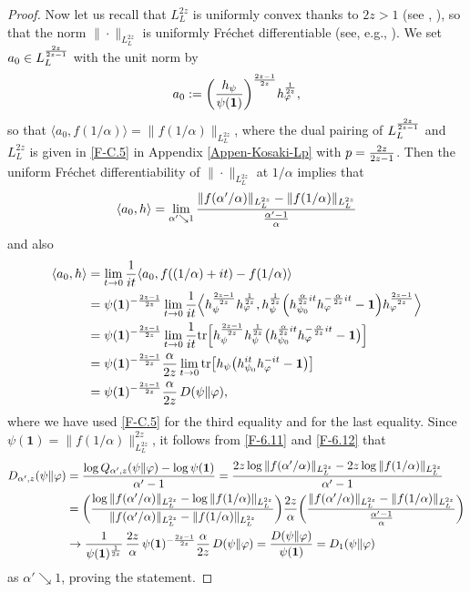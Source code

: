 \documentclass[12pt]{article}
\theoremstyle{definition}
\theoremstyle{remark}
\numberwithin{equation}{section}
\def\Tr{\mathrm{tr}}
\def\<{\langle}
\def\>{\rangle}
\def\ffi{\varphi}
\def\1{\mathbf{1}}
\begin{document}
\begin{proof}
Now let us recall that $L^{2z}_L$ is uniformly convex thanks to $2z>1$ (see \cite{haagerup1979lpspaces},
\cite[Theorem 4.2]{kosaki1984applications}), so that the norm $\|\cdot\|_{L^{2z}_L}$ is uniformly Fr\'echet
differentiable (see, e.g., \cite[Part 3, Chap.~II]{beauzamy1982introduction}). We set
$a_0\in L^{2z\over2z-1}_L$ with the unit norm by
\[
a_0:=\biggl({h_\psi\over\psi(\1)}\biggr)^{2z-1\over2z}h_\ffi^{1\over2z},
\]
so that $\<a_0,f(1/\alpha)\>=\|f(1/\alpha)\|_{L^{2z}_L}$, where the dual pairing of $L^{2z\over2z-1}_L$
and $L^{2z}_L$ is given in \eqref{F-C.5} in Appendix \ref{Appen-Kosaki-Lp} with $p={2z\over2z-1}$. Then
the uniform Fr\'echet differentiability of $\|\cdot\|_{L^{2z}_L}$ at $1/\alpha$ implies that
\begin{align}\label{F-6.11}
\<a_0,h\>=\lim_{\alpha'\searrow1}{\|f(\alpha'/\alpha)\|_{L^{2z}_L}-\|f(1/\alpha)\|_{L^{2z}_L}
\over{\alpha'-1\over\alpha}}
\end{align}
and also
\begin{align}
\<a_0,h\>&=\lim_{t\to0}{1\over it}\<a_0,f((1/\alpha)+it)-f(1/\alpha)\> \nonumber\\
&=\psi(\1)^{-{2z-1\over2z}}\lim_{t\to0}{1\over it}\Bigl\<h_\psi^{2z-1\over2z}h_\ffi^{1\over2z},
h_\psi^{1\over2z}\Bigl(h_{\psi_0}^{{\alpha\over2z}it}h_\ffi^{-{\alpha\over2z}it}-\1\Bigr)
h_\ffi^{2z-1\over2z}\Bigr\> \nonumber\\
&=\psi(\1)^{-{2z-1\over2z}}\lim_{t\to0}{1\over it}\Tr\Bigl[h_\psi^{2z-1\over2z}h_\psi^{1\over2z}
\bigl(h_{\psi_0}^{{\alpha\over2z}it}h_\ffi^{-{\alpha\over2z}it}-\1\bigr)\Bigr] \nonumber\\
&=\psi(\1)^{-{2z-1\over2z}}{\alpha\over2z}
\lim_{t\to0}\Tr\bigl[h_\psi\bigl(h_{\psi_0}^{it}h_\ffi^{-it}-\1\bigr)\bigr] \nonumber\\
&=\psi(\1)^{-{2z-1\over2z}}{\alpha\over2z}\,D(\psi\|\ffi), \label{F-6.12}
\end{align}
where we have used \eqref{F-C.5} for the third equality and \cite[Theorem 5.7]{ohya1993quantum}
for the last equality. Since $\psi(\1)=\|f(1/\alpha)\|_{L^{2z}_L}^{2z}$, it follows from \eqref{F-6.11} and
\eqref{F-6.12} that
\begin{align*}
D_{\alpha',z}(\psi\|\ffi)
&={\log Q_{\alpha',z}(\psi\|\ffi)-\log\psi(\1)\over\alpha'-1}
={2z\log\|f(\alpha'/\alpha)\|_{L^{2z}_L}-2z\log\|f(1/\alpha)\|_{L^{2z}_L}\over\alpha'-1} \\
&=\biggl({\log\|f(\alpha'/\alpha)\|_{L^{2z}_L}-\log\|f(1/\alpha)\|_{L^{2z}_L}\over
\|f(\alpha'/\alpha)\|_{L^{2z}_L}-\|f(1/\alpha)\|_{L^{2z}_L}}\biggr)
{2z\over\alpha}\biggl({\|f(\alpha'/\alpha)\|_{L^{2z}_L}-\|f(1/\alpha)\|_{L^{2z}_L}\over
{\alpha'-1\over\alpha}}\biggr) \\
&\to{1\over\psi(\1)^{1\over2z}}\,{2z\over\alpha}\,\psi(\1)^{-{2z-1\over2z}}{\alpha\over2z}\,D(\psi\|\ffi)
={D(\psi\|\ffi)\over\psi(\1)}=D_1(\psi\|\ffi)
\end{align*}
as $\alpha'\searrow1$, proving the statement.
\end{proof}
\end{document}
